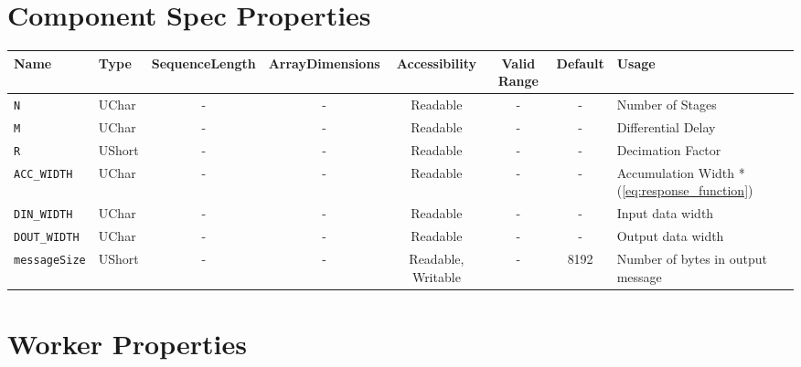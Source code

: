 \documentclass{article}
\begin{document}
\begin{landscape}
	\section*{Component Spec Properties}
	\begin{scriptsize}
		\begin{tabular}{|p{3cm}|p{1.5cm}|c|c|c|c|c|p{7cm}|}
			\hline
			\rowcolor{blue}
			Name                      & Type   & SequenceLength & ArrayDimensions & Accessibility      & Valid Range & Default & Usage                                            \\
			\hline \verb+N+           & UChar  & -              & -               & Readable           & -           & -       & Number of Stages                                 \\
			\hline \verb+M+           & UChar  & -              & -               & Readable           & -           & -       & Differential Delay                               \\
			\hline \verb+R+           & UShort & -              & -               & Readable           & -           & -       & Decimation Factor                                \\
			\hline \verb+ACC_WIDTH+   & UChar  & -              & -               & Readable           & -           & -       & Accumulation Width *(\ref{eq:response_function}) \\
			\hline \verb+DIN_WIDTH+   & UChar  & -              & -               & Readable           & -           & -       & Input data width                                 \\
			\hline \verb+DOUT_WIDTH+  & UChar  & -              & -               & Readable           & -           & -       & Output data width                                \\
			\hline \verb+messageSize+ & UShort & -              & -               & Readable, Writable & -           & 8192    & Number of bytes in output message                \\
			\hline
		\end{tabular}
	\end{scriptsize}
	\section*{Worker Properties}


\end{landscape}
\end{document}
